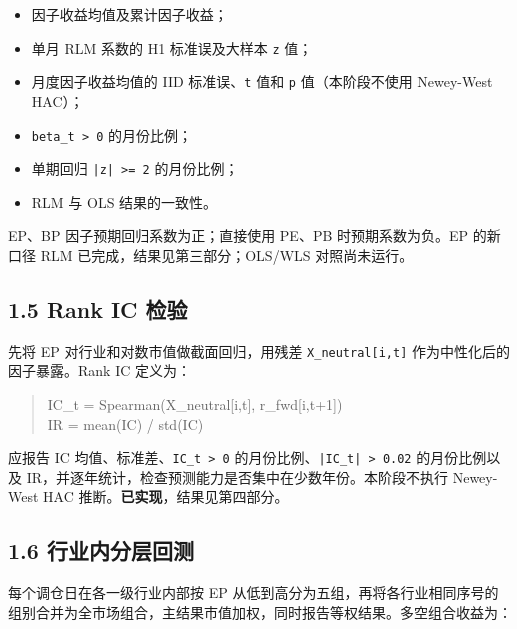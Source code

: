 \documentclass[UTF8,a4paper,11pt]{ctexart}
\begin{document}
\begin{itemize}[leftmargin=2em,itemsep=2pt,topsep=3pt]
\item 
因子收益均值及累计因子收益；

\item 
单月 RLM 系数的 H1 标准误及大样本 \texttt{z} 值；

\item 
月度因子收益均值的 IID 标准误、\texttt{t} 值和 \texttt{p} 值（本阶段不使用 Newey-West HAC）；

\item 
\texttt{beta\_t > 0} 的月份比例；

\item 
单期回归 \texttt{|z| >= 2} 的月份比例；

\item 
RLM 与 OLS 结果的一致性。

\end{itemize}

EP、BP 因子预期回归系数为正；直接使用 PE、PB 时预期系数为负。EP 的新口径 RLM 已完成，结果见第三部分；OLS/WLS 对照尚未运行。

{}
\subsection*{1.5 Rank IC 检验}

先将 EP 对行业和对数市值做截面回归，用残差 \texttt{X\_neutral[i,t]} 作为中性化后的因子暴露。Rank IC 定义为：

\begin{quote}\ttfamily\small
IC\_t = Spearman(X\_neutral[i,t], r\_fwd[i,t+1])\\
IR   = mean(IC) / std(IC)\\
\end{quote}

应报告 IC 均值、标准差、\texttt{IC\_t > 0} 的月份比例、\texttt{|IC\_t| > 0.02} 的月份比例以及 IR，并逐年统计，检查预测能力是否集中在少数年份。本阶段不执行 Newey-West HAC 推断。\textbf{已实现}，结果见第四部分。

{}
\subsection*{1.6 行业内分层回测}

每个调仓日在各一级行业内部按 EP 从低到高分为五组，再将各行业相同序号的组别合并为全市场组合，主结果市值加权，同时报告等权结果。多空组合收益为：
\end{document}
